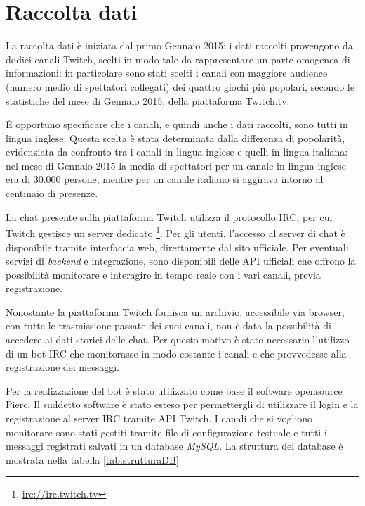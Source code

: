 \documentclass[a4paper,12pt,openright,twoside]{report}
\theoremstyle{definition}
\begin{document}
\section{Raccolta dati}
La raccolta dati è iniziata dal primo Gennaio 2015; i dati raccolti provengono da dodici canali 
Twitch, scelti in modo tale da rappresentare un parte omogenea di informazioni: in particolare sono stati scelti i canali con 
maggiore audience (numero medio di spettatori collegati) dei quattro giochi più popolari, 
secondo le statistiche del mese di Gennaio 2015, della piattaforma Twitch.tv.

È opportuno specificare che i canali, e quindi anche i dati raccolti, 
sono tutti in lingua inglese. Questa scelta è stata determinata dalla 
differenza di popolarità, evidenziata da confronto tra i canali in lingua 
inglese e quelli in lingua italiana: nel mese di Gennaio 2015 la media di 
spettatori per un canale in lingua inglese era di 30.000 persone, 
mentre per un canale italiano si aggirava intorno al centinaio di presenze.

La chat presente sulla piattaforma Twitch utilizza il protocollo IRC, 
per cui Twitch gestisce un server dedicato \footnote{\url{irc://irc.twitch.tv}}. 
Per gli utenti, l’accesso al server di chat è disponibile tramite interfaccia web, 
direttamente dal sito ufficiale. Per eventuali servizi di \emph{backend}
e integrazione, sono disponibili 
delle API ufficiali che offrono la possibilità monitorare e interagire in tempo reale 
con i vari canali, previa registrazione.

Nonostante la piattaforma Twitch fornisca un archivio, accessibile via browser, 
con tutte le trasmissione passate dei suoi canali, 
non è data la possibilità di accedere ai dati storici delle chat. 
Per questo motivo è stato necessario l’utilizzo di un bot IRC che monitorasse in 
modo costante i canali e che provvedesse alla registrazione dei messaggi.

Per la realizzazione del bot è stato utilizzato come base il software opensource Pierc. 
Il suddetto software è stato esteso per permettergli di utilizzare il login e la registrazione 
al server IRC tramite API Twitch. I canali che si vogliono monitorare sono stati 
gestiti tramite file di configurazione testuale e tutti i messaggi registrati salvati 
in un database \emph{MySQL}. La struttura del database è mostrata nella tabella \ref{tab:strutturaDB}
\end{document}
